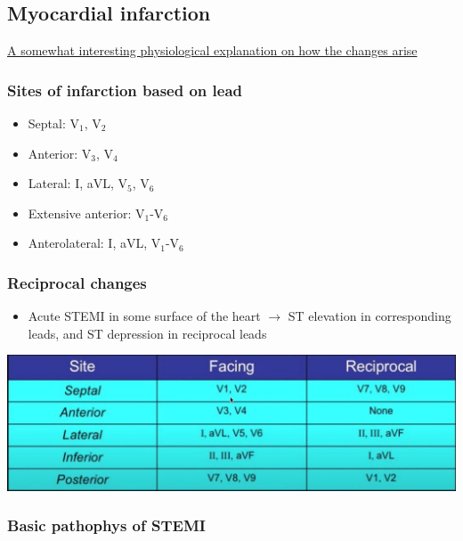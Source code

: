 \documentclass[
  12pt,
]{memoir}
\providecommand{\tightlist}{%
  \setlength{\itemsep}{0pt}\setlength{\parskip}{0pt}}
\begin{document}
\hypertarget{myocardial-infarction}{%
\subsection{Myocardial infarction}\label{myocardial-infarction}}

\href{https://www.cvphysiology.com/CAD/CAD012}{A somewhat interesting
physiological explanation on how the changes arise}

\hypertarget{sites-of-infarction-based-on-lead}{%
\subsubsection{Sites of infarction based on
lead}\label{sites-of-infarction-based-on-lead}}

\begin{itemize}
\tightlist
\item
  Septal: V\(_1\), V\(_2\)
\item
  Anterior: V\(_3\), V\(_4\)
\item
  Lateral: I, aVL, V\(_5\), V\(_6\)
\item
  Extensive anterior: V\(_1\)-V\(_6\)
\item
  Anterolateral: I, aVL, V\(_1\)-V\(_6\)
\end{itemize}

\hypertarget{reciprocal-changes}{%
\subsubsection{Reciprocal changes}\label{reciprocal-changes}}

\begin{itemize}
\tightlist
\item
  Acute STEMI in some surface of the heart \(\rightarrow\) ST elevation
  in corresponding leads, and ST depression in reciprocal leads
\end{itemize}

\includegraphics[width=.7\textwidth]{../assets/reciprocal-leads.jpg}

\hypertarget{basic-pathophys-of-stemi}{%
\subsubsection{Basic pathophys of
STEMI}\label{basic-pathophys-of-stemi}}
\end{document}
